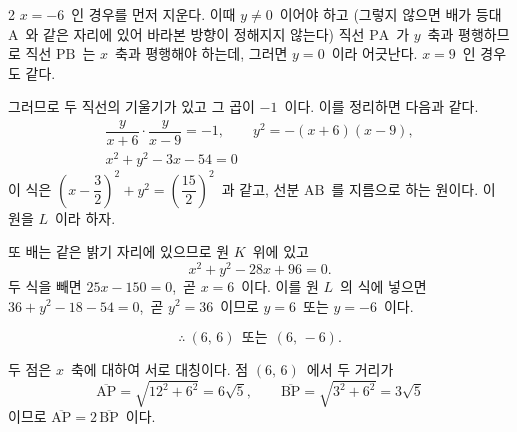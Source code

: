 \documentclass[10pt,fleqn]{article}
\begin{document}
\begin{multicols*}{2}
$x=-6$\ 인 경우를 먼저 지운다. 이때 $y\ne 0$\ 이어야 하고 (그렇지 않으면 배가 등대 $\mathrm{A}$\ 와 같은 자리에 있어 바라본 방향이 정해지지 않는다) 직선 $\mathrm{PA}$\ 가 $y$\ 축과 평행하므로 직선 $\mathrm{PB}$\ 는 $x$\ 축과 평행해야 하는데, 그러면 $y=0$\ 이라 어긋난다. $x=9$\ 인 경우도 같다.

그러므로 두 직선의 기울기가 있고 그 곱이 $-1$\ 이다. 이를 정리하면 다음과 같다.
\begin{gather*}
\dfrac{y}{x+6}\cdot\dfrac{y}{x-9}=-1,\qquad y^{2}=-(x+6)(x-9),\\[2pt]
x^{2}+y^{2}-3x-54=0
\end{gather*}
이 식은 $\left(x-\dfrac{3}{2}\right)^{2}+y^{2}=\left(\dfrac{15}{2}\right)^{2}$\ 과 같고, 선분 $\mathrm{AB}$\ 를 지름으로 하는 원이다. 이 원을 $L$\ 이라 하자.

또 배는 같은 밝기 자리에 있으므로 원 $K$\ 위에 있고
$$x^{2}+y^{2}-28x+96=0.$$
두 식을 빼면 $25x-150=0$,\ 곧 $x=6$\ 이다. 이를 원 $L$\ 의 식에 넣으면 $36+y^{2}-18-54=0$,\ 곧 $y^{2}=36$\ 이므로 $y=6$\ 또는 $y=-6$\ 이다.

$$\therefore\ (6,\,6)\ \ \text{또는}\ \ (6,\,-6).$$

두 점은 $x$\ 축에 대하여 서로 대칭이다. 점 $(6,\,6)$\ 에서 두 거리가
$$\overline{\mathrm{AP}}=\sqrt{12^{2}+6^{2}}=6\sqrt{5},\qquad \overline{\mathrm{BP}}=\sqrt{3^{2}+6^{2}}=3\sqrt{5}$$
이므로 $\overline{\mathrm{AP}}=2\,\overline{\mathrm{BP}}$\ 이다.


\end{multicols*}
\end{document}
